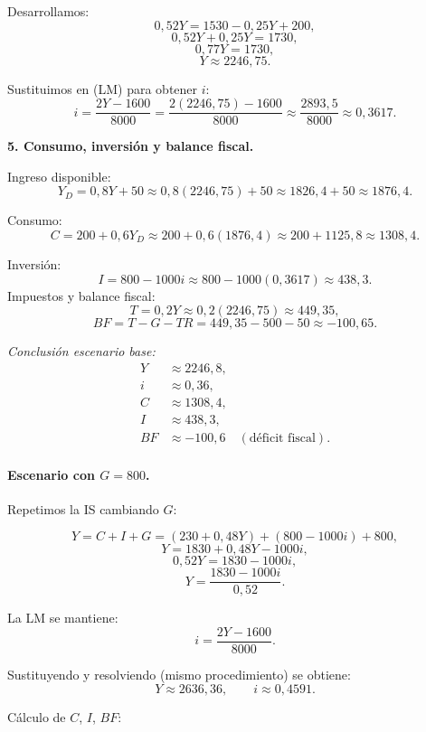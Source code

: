 \documentclass[11pt,addpoints]{article}
\begin{document}
Desarrollamos:
\[
0{,}52Y = 1530 - 0{,}25Y + 200,
\]
\[
0{,}52Y + 0{,}25Y = 1730,
\]
\[
0{,}77Y = 1730,
\]
\[
Y \approx 2246{,}75.
\]

\medskip

Sustituimos en (LM) para obtener $i$:
\[
i = \frac{2Y - 1600}{8000}
= \frac{2(2246{,}75) - 1600}{8000}
\approx \frac{2893{,}5}{8000}
\approx 0{,}3617.
\]

\medskip

\textbf{5. Consumo, inversión y balance fiscal.}

Ingreso disponible:
\[
Y_D = 0{,}8Y + 50 \approx 0{,}8(2246{,}75) + 50 \approx 1826{,}4 + 50 \approx 1876{,}4.
\]

Consumo:
\[
C = 200 + 0{,}6Y_D \approx 200 + 0{,}6(1876{,}4) \approx 200 + 1125{,}8 \approx 1308{,}4.
\]

Inversión:
\[
I = 800 - 1000i \approx 800 - 1000(0{,}3617) \approx 438{,}3.
\]
\newpage
\vspace*{0.5cm}
Impuestos y balance fiscal:
\[
T = 0{,}2Y \approx 0{,}2(2246{,}75) \approx 449{,}35,
\]
\[
BF = T - G - TR = 449{,}35 - 500 - 50 \approx -100{,}65.
\]

\emph{Conclusión escenario base:}
\begin{align*}
Y &\approx 2246{,}8, \\
i &\approx 0{,}36, \\
C &\approx 1308{,}4, \\
I &\approx 438{,}3, \\
BF &\approx -100{,}6 \quad (\text{déficit fiscal}).
\end{align*}

\medskip

\paragraph{Escenario con $G = 800$.}

Repetimos la IS cambiando $G$:

\[
Y = C + I + G = (230 + 0{,}48Y) + (800 - 1000i) + 800,
\]
\[
Y = 1830 + 0{,}48Y - 1000i,
\]
\[
0{,}52Y = 1830 - 1000i,
\]
\[
Y = \frac{1830 - 1000i}{0{,}52}. \tag{IS'}
\]

La LM se mantiene:
\[
i = \frac{2Y - 1600}{8000}.
\]

Sustituyendo y resolviendo (mismo procedimiento) se obtiene:
\[
Y \approx 2636{,}36, \qquad
i \approx 0{,}4591.
\]

\medskip

Cálculo de $C$, $I$, $BF$:
\end{document}

